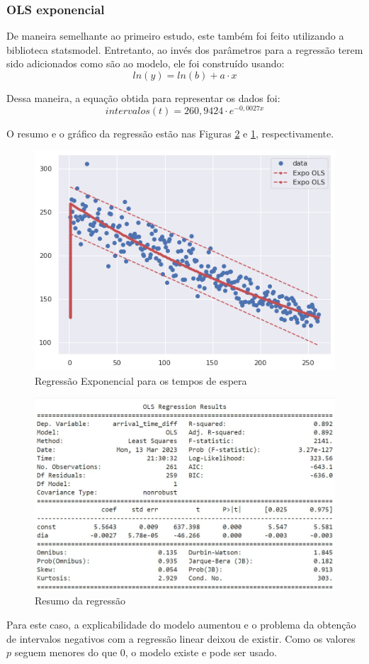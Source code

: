 \subsubsection{OLS exponencial}

De maneira semelhante ao primeiro estudo, este também foi feito utilizando a biblioteca statsmodel. Entretanto, ao invés dos parâmetros para a regressão terem sido adicionados como são ao modelo, ele foi construído usando: $$ln(y) = ln(b) + a \cdot x$$

Dessa maneira, a equação obtida para representar os dados foi:
$$intervalos(t) = 260,9424 \cdot e^{-0,0027x} $$

O resumo e o gráfico da regressão estão nas Figuras \ref*{fig: sum_Expo_OLS} e \ref*{fig: plot_Expo_OLS}, respectivamente.
\begin{figure}[H]
    \includegraphics{analise-de-dados/regressao/regressao_EXPO.png}
    \caption{Regressão Exponencial para os tempos de espera}
    \label{fig: plot_Expo_OLS}
\end{figure}

\begin{figure}[H]
    \includegraphics[scale = 0.85]{analise-de-dados/regressao/EXPO_OLS_Summary.jpg}
    \caption{Resumo da regressão}
    \label{fig: sum_Expo_OLS}
\end{figure}

Para este caso, a explicabilidade do modelo aumentou e o problema da obtenção de intervalos negativos com a regressão linear deixou de existir. Como os valores $p$ seguem menores do que 0, o modelo existe e pode ser usado.
